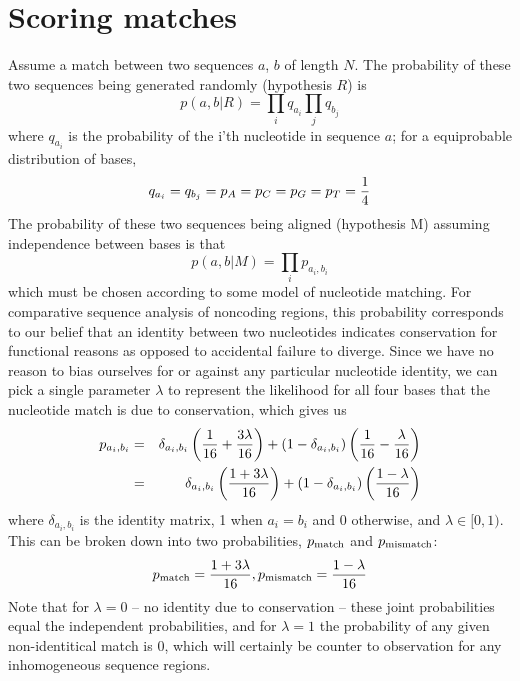 \section{Scoring matches}
Assume a match between two sequences $a$, $b$ of length $N$.
The probability of these two sequences being generated randomly
(hypothesis $R$) is
\[
p(a, b | R) = \prod_i q_{a_i} \prod_j q_{b_j}
\]
where $q_{a_i}$ is the probability of the i'th nucleotide in sequence $a$;
for a equiprobable distribution of bases,
\[
q_{a_i} = q_{b_j} = p_A = p_C = p_G = p_T = {1 \over 4}
\]
The probability of these two sequences being aligned (hypothesis
M) assuming independence between bases is that
\[
p(a, b | M) = \prod_i p_{a_i,b_i}
\]
which must be chosen according to some model of nucleotide matching.  For
comparative sequence analysis of noncoding regions, this probability
corresponds to our belief that an identity between two nucleotides
indicates conservation for functional reasons as opposed to accidental
failure to diverge.  Since we have no reason
to bias ourselves for or against any particular nucleotide identity, we can
pick a single parameter $\lambda$ to represent the likelihood for
all four bases that the nucleotide match is due to conservation,
which gives us
\begin{eqnarray*}
p_{a_i,b_i} &=& \delta_{a_i,b_i} \left({1 \over 16} + {3 \lambda \over 16}\right) + 
            (1 - \delta_{a_i,b_i}) \left({1 \over 16} - {\lambda \over 16}\right) \\
&=& \delta_{a_i,b_i} \left({ 1 + 3\lambda \over 16}\right) +
            (1 - \delta_{a_i,b_i}) \left({ 1-\lambda \over 16}\right) \\
\end{eqnarray*}
where $\delta_{a_i,b_i}$ is the identity matrix, 1 when $a_i=b_i$ and
 0 otherwise, and
$\lambda \in [0,1)$.  This can be broken down into two probabilities,
$p_{\rm match}$ and $p_{\rm mismatch}$:
\[
p_{\rm match} = { 1 + 3\lambda \over 16 },
p_{\rm mismatch} = { 1 - \lambda \over 16}
\]
Note that for $\lambda=0$ -- no identity due to conservation -- these joint
probabilities equal the independent probabilities, and for $\lambda=1$
the probability of any given non-identitical match is 0, which will certainly
be counter to observation for any inhomogeneous sequence regions.

